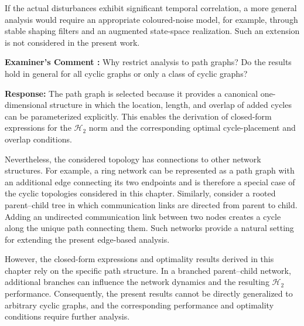 \documentclass[11pt,a4paper]{article}
\newcounter{examcomment}
\renewcommand{\theexamcomment}{\arabic{examcomment}}
\newcommand{\comment}[1]{%
\refstepcounter{examcomment}%
\par\vspace{5pt}\noindent
\colorbox{gray!13}{%
	\parbox{\dimexpr\linewidth-2\fboxsep}{%
		\textbf{Examiner's Comment \theexamcomment:} #1%
	}%
}%
\par
}
\newcounter{problem}
\newcommand{\response}{\par\textbf{Response:} }
\newcommand{\revision}{\par\textbf{Proposed thesis revision:} }
\begin{document}
If the actual disturbances exhibit significant temporal correlation, a more general analysis would require an appropriate coloured-noise model, for example, through stable shaping filters and an augmented state-space realization. Such an extension is not considered in the present work.


\comment{Why restrict analysis to path graphs? Do the results hold in general for all cyclic graphs or only a class of cyclic graphs?}
\response
The path graph is selected because it provides a canonical one-dimensional structure in which the location, length, and overlap of added cycles can be parameterized explicitly. This enables the derivation of closed-form expressions for the $\mathcal{H}_2$ norm and the corresponding optimal cycle-placement and overlap conditions.

Nevertheless, the considered topology has connections to other network structures. For example, a ring network can be represented as a path graph with an additional edge connecting its two endpoints and is therefore a special case of the cyclic topologies considered in this chapter. Similarly, consider a rooted parent--child tree in which communication links are directed from parent to child. Adding an undirected communication link between two nodes creates a cycle along the unique path connecting them. Such networks provide a natural setting for extending the present edge-based analysis.

However, the closed-form expressions and optimality results derived in this chapter rely on the specific path structure. In a branched parent--child network, additional branches can influence the network dynamics and the resulting $\mathcal{H}_2$ performance. Consequently, the present results cannot be directly generalized to arbitrary cyclic graphs, and the corresponding performance and optimality conditions require further analysis.

\end{document}
